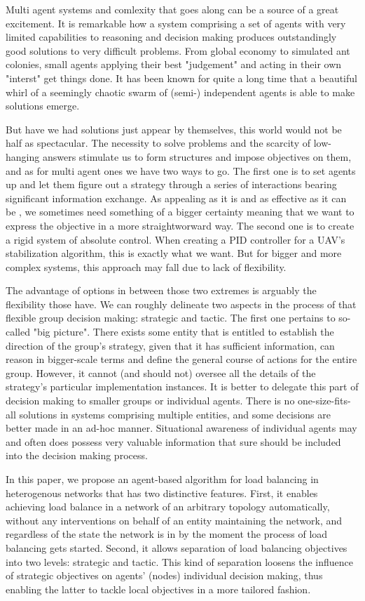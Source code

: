 Multi agent systems and comlexity that goes along can be a source of a great excitement.
It is remarkable how a system comprising a set of agents with very limited capabilities to reasoning and decision making produces outstandingly good solutions to very difficult problems.
From global economy to simulated ant colonies, small agents applying their best "judgement" and acting in their own "interst" get things done.
It has been known for quite a long time that a beautiful whirl of a seemingly chaotic swarm of (semi-) independent agents is able to make solutions emerge.

But have we had solutions just appear by themselves, this world would not be half as spectacular.
The necessity to solve problems and the scarcity of low-hanging answers stimulate us to form structures and impose objectives on them, and as for multi agent ones we have two ways to go.
The first one is to set agents up and let them figure out a strategy through a series of interactions bearing significant information exchange.
As appealing as it is and as effective as it can be \cite{dorigo-2006}, we sometimes need something of a bigger certainty meaning that we want to express the objective in a more straightworward way.
The second one is to create a rigid system of absolute control.
When creating a PID controller for a UAV's stabilization algorithm, this is exactly what we want.
But for bigger and more complex systems, this approach may fall due to lack of flexibility.

The advantage of options in between those two extremes is arguably the flexibility those have. We can roughly delineate two
aspects in the process of that flexible group decision making: strategic and tactic. The first one pertains to
so-called "big picture". There exists some entity that is entitled to establish the direction of the group's strategy, given that it
has sufficient information, can reason in bigger-scale terms and define the general course of actions for the entire
group. However, it cannot (and should not) oversee all the details of the strategy's particular implementation
instances. It is better to delegate this part of decision making to smaller groups or individual agents. There is no
one-size-fits-all solutions in systems comprising multiple entities, and some decisions are better made in an ad-hoc
manner.
Situational awareness \cite{endsley-1995} of individual agents may and often does possess very valuable information that
sure should be included into the decision making process.

In this paper, we propose an agent-based algorithm for load balancing in heterogenous networks that has two distinctive features.
First, it enables achieving load balance in a network of an arbitrary topology automatically, without any interventions on behalf of an entity maintaining the network, and regardless of the state the network is in by the moment the process of load balancing gets started.
Second, it allows separation of load balancing objectives into two levels: strategic and tactic.
This kind of separation loosens the influence of strategic objectives on  agents' (nodes) individual decision making, thus enabling the latter to tackle local objectives in a more tailored fashion.


